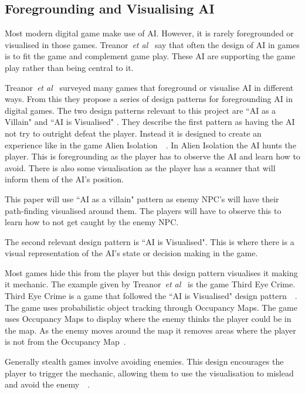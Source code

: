 \documentclass[journal]{IEEEtran}
\begin{document}
\subsection{Foregrounding and Visualising AI}
Most modern digital game make use of AI.  However, it is rarely foregrounded or visualised in those games. Treanor~\textit{et al}~\cite{treanor2015} say that often the design of AI in games is to fit the game and complement game play. These AI are supporting the game play rather than being central to it.

Treanor~\textit{et al}~\cite{treanor2015} surveyed many games that foreground or visualise AI in different ways.    From this they propose a series of design patterns for foregrounding AI in digital games. 
The two design patterns relevant to this project are ``AI as a Villain" and ``AI is Visualised" .  They describe the first pattern as having the AI not try to outright defeat the player. Instead it is designed to create an experience like in the game Alien Isolation~\cite{treanor2015}~\cite{game:AlienIsolation}.  In Alien Isolation the AI hunts the player. This is foregrounding as the player has to observe the AI and learn how to avoid.  There is also some visualisation as the player has a scanner that will inform them of the AI's position. 

This paper will use ``AI as a villain" pattern as enemy NPC's  will have their path-finding visualised around them. The players will have to observe this to learn how to not get caught by the enemy NPC.    


The second relevant design pattern is ``AI is Visualised".  This is where there is a visual representation of the AI's state or decision making in the game. 

Most games hide this from the player but this design pattern visualises it making it mechanic.  
The example given by Treanor~\textit{et al}~\cite{treanor2015} is the game Third Eye Crime.  Third Eye Crime is a game that followed the ``AI is Visualised" design pattern~\cite{Isla2014}~\cite{game:ThirdEyeCrime}.  
The game uses probabilistic object tracking through Occupancy Maps. The game uses Occupancy Maps to display where the enemy thinks the player could be in the map. As the enemy moves around the map it removes areas where the player is not from the Occupancy Map~\cite{Isla2014}.  

Generally stealth games involve avoiding enemies.  This design encourages the player to trigger the mechanic,  allowing them to use the visualisation to mislead and avoid the enemy~\cite{Isla2014}~\cite{game:ThirdEyeCrime}. 
\end{document}
